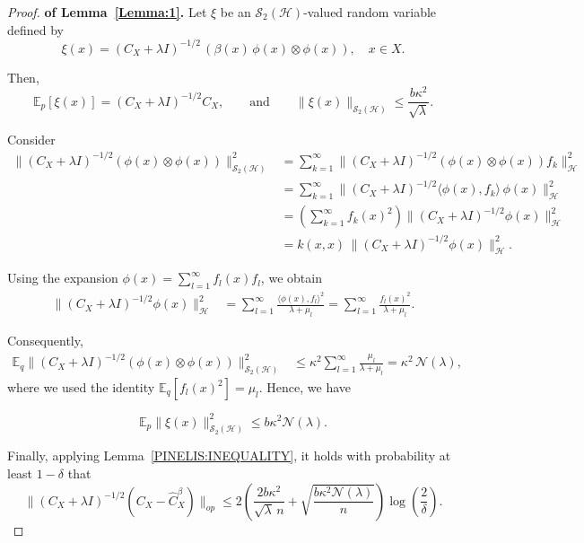 \documentclass[twoside,11pt]{article}
\begin{document}
\begin{proof}\textbf{of Lemma~\ref{Lemma:1}.}
Let \(\xi\) be an \(\mathcal{S}_2(\mathcal{H})\)-valued random variable defined by
\[
\xi(x)
=
(C_{X}+\lambda I)^{-1/2}\,(\beta(x)\, \phi(x)\otimes \phi(x)) ,\quad x\in X.
\]

\noindent
Then,
\[
\mathbb{E}_p[\xi(x)]
=
(C_{X}+\lambda I)^{-1/2} C_X,
\qquad
\text{and}
\qquad
\|\xi(x)\|_{\mathcal{S}_2(\mathcal{H})}
\le
\frac{b\kappa^2}{\sqrt{\lambda}}.
\]

\noindent
Consider
\begin{align*}
\bigl\|
(C_{X}+\lambda I)^{-1/2}(\phi(x)\otimes \phi(x))
\bigr\|_{\mathcal S_2(\mathcal H)}^2
&=
\sum_{k=1}^\infty
\bigl\|
(C_{X}+\lambda I)^{-1/2}
(\phi(x)\otimes \phi(x)) f_k
\bigr\|_{\mathcal H}^2 \\[0.4em]
&=
\sum_{k=1}^\infty
\bigl\|
(C_{X}+\lambda I)^{-1/2}
\langle \phi(x), f_k\rangle\, \phi(x)
\bigr\|_{\mathcal H}^2 \\[0.4em]
&=
\left(\sum_{k=1}^\infty f_k(x)^2\right)
\bigl\|
(C_{X}+\lambda I)^{-1/2}\phi(x)
\bigr\|_{\mathcal H}^2 \\[0.4em]
&=
k(x,x)\,
\bigl\|
(C_{X}+\lambda I)^{-1/2}\phi(x)
\bigr\|_{\mathcal H}^2 .
\end{align*}

\noindent
Using the expansion \(\phi(x)=\sum_{l=1}^\infty f_l(x) f_l\), we obtain
\begin{align*}
\bigl\|
(C_{X}+\lambda I)^{-1/2}\phi(x)
\bigr\|_{\mathcal H}^2
&=
\sum_{l=1}^\infty
\frac{\langle \phi(x), f_l\rangle^2}{\lambda+\mu_l}
=
\sum_{l=1}^\infty
\frac{f_l(x)^2}{\lambda+\mu_l}.
\end{align*}

\noindent
Consequently,
\begin{align*}
\mathbb{E}_q
\bigl\|
(C_{X}+\lambda I)^{-1/2}(\phi(x)\otimes \phi(x))
\bigr\|_{\mathcal S_2(\mathcal H)}^2
&\leq
\kappa^2
\sum_{l=1}^\infty
\frac{\mu_l}{\lambda+\mu_l}
=
\kappa^2\,\mathcal{N}(\lambda),
\end{align*}
where we used the identity \(\mathbb{E}_q[f_l(x)^2]=\mu_l\). Hence, we have 

\[\mathbb{E}_p\|\xi(x)\|^2_{\mathcal{S}_2(\mathcal{H})}\leq b\kappa^2\mathcal{N}(\lambda).
\]

\noindent
Finally, applying Lemma~\ref{PINELIS:INEQUALITY}, it holds with probability at least \(1-\delta\) that
\[
\bigl\|(C_{X}+\lambda I)^{-1/2} (C_X - \widehat{C}_X^\beta)\bigr\|_{op}
\le
2\left(
\frac{2b\kappa^2}{\sqrt{\lambda}\,n}
+
\sqrt{\frac{b\kappa^2\mathcal{N}(\lambda)}{n}}
\right)
\log\!\left(\frac{2}{\delta}\right).
\]

\end{proof}
\end{document}
